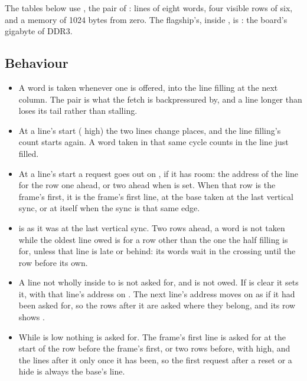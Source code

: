 The tables below use ,
the pair of : lines of eight words, four visible
rows of six, and a memory of 1024 bytes from zero. The flagship's,
inside , is : the board's gigabyte of DDR3.


\subsection*{Behaviour}

\begin{itemize}
\item A word is taken whenever one is offered, into the line filling
at the next column. The pair is what the fetch is backpressured by,
and a line longer than  loses its tail rather than stalling.
\item At a line's start ( high) the two lines change
places, and the line filling's count starts again. A word taken in
that same cycle counts in the line just filled.
\item At a line's start a request goes out on , if it has
room: the address of the line for the row one ahead, or two ahead
when  is set. When that row is the frame's first, it
is the frame's first line, at the base taken at the last vertical
sync, or at  itself when the sync is that same edge.
\item {} is  as it was at the last vertical
sync. Two rows ahead, a word is not taken while the oldest line owed
is for a row other than the one the half filling is for, unless that
line is late or behind: its words wait in the crossing until the row
before its own.
\item A line not wholly inside  to  is not asked
for, and is not owed. If  is clear it sets it, with that
line's address on . The next line's address moves on
as if it had been asked for, so the rows after it are asked where they
belong, and its row shows .
\item While  is low nothing is asked for. The frame's first
line is asked for at the start of the row before the frame's first, or
two rows before, with  high, and the lines after it only
once it has been, so the first request after a reset or a hide is
always the base's line.

\end{itemize}
